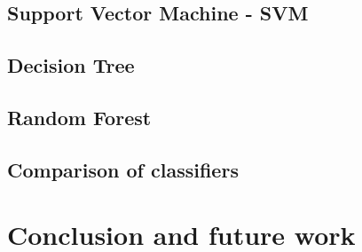 \documentclass[11pt,a4paper,titlepage]{article}
\begin{document}
\subsection{Support Vector Machine - SVM}
\subsection{Decision Tree}
\subsection{Random Forest}
\subsection{Comparison of classifiers}

\section{Conclusion and future work}
\end{document}
